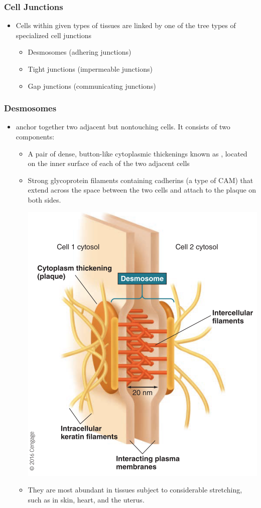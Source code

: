 \documentclass{article}
\numberwithin{equation}{section}
\begin{document}
\subsubsection{Cell Junctions}
\begin{itemize}
    \item Cells within given types of tissues are linked by one of the tree types of specialized cell junctions
    \begin{itemize}
        \item Desmosomes (adhering junctions) 
        \item Tight junctions (impermeable junctions)
        \item Gap junctions (communicating junctions)
    \end{itemize}
\end{itemize}
\subsubsection{Desmosomes}
\begin{itemize}
    \item {} anchor together two adjacent but nontouching cells. It consists of two components: 
    \begin{itemize}
        \item A pair of dense, button-like cytoplasmic thickenings known as , located on the inner surface of each of the two adjacent cells
        \item Strong glycoprotein filaments containing cadherins (a type of CAM) that extend across the space between the two cells and attach to the plaque on both sides.
        \begin{center}
            \includegraphics[width=0.5\linewidth]{figures/desmosome.png}
        \end{center}
        \item They are most abundant in tissues subject to considerable stretching, such as in skin, heart, and the uterus.
    \end{itemize}
\end{itemize}
\end{document}
